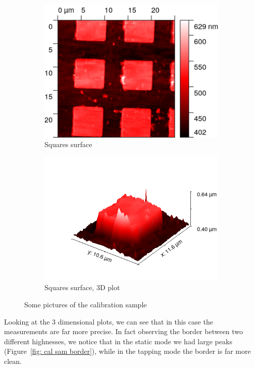 \documentclass[11pt,a4paper]{article}
\begin{document}
\begin{figure}[H]
\begin{subfigure}[b]{0.45\textwidth}
\includegraphics[width=\textwidth]{tm_squares}
\caption{Squares surface}
\label{fig:}
\end{subfigure}
\begin{subfigure}[b]{0.45\textwidth}
\includegraphics[width=\textwidth]{tm_squares_3D}
\caption{Squares surface, 3D plot}
\label{fig:sm_border}
\end{subfigure}
\caption{Some pictures of the calibration sample}
\end{figure}

Looking at the 3 dimensional plots, we can see that in this case the measurements are far more precise. In fact observing the border between two different highnesses, we notice that in the static mode we had large peaks (Figure~\ref{fig: cal sam border}), while in the tapping mode the border is far more clean.
\end{document}

